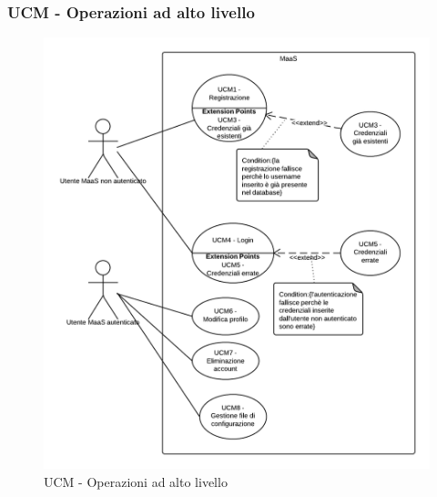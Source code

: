 \subsubsection{UCM - Operazioni ad alto livello} 
    \begin{center}
    \begin{figure}[H]
      \includegraphics[scale=0.16]{UML/UCM - Operazioni ad alto livello.png}
      \caption{UCM - Operazioni ad alto livello} 
    \end{figure}
    \end{center}
    
